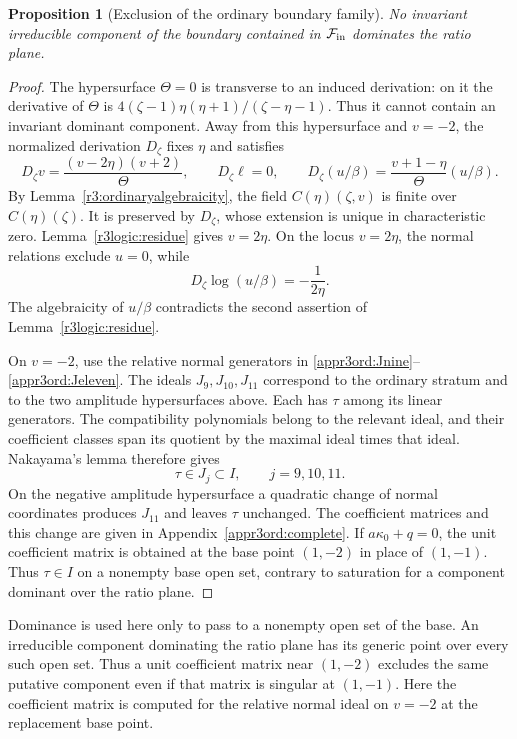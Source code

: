 \documentclass[11pt,a4paper]{article}
\numberwithin{equation}{section}
\theoremstyle{plain}
\newtheorem{proposition}[theorem]{Proposition}
\theoremstyle{definition}
\theoremstyle{remark}
\begin{document}
\begin{proposition}[Exclusion of the ordinary boundary family]
\label{r3:ordinaryexclusion}
No invariant irreducible component of the boundary contained
in $\mathcal F_{\rm in}$ dominates the ratio plane.
\end{proposition}
\begin{proof}
The hypersurface $\Theta=0$ is transverse to an induced derivation:
on it the derivative of $\Theta$ is
$4(\zeta-1)\eta(\eta+1)/(\zeta-\eta-1)$.
Thus it cannot contain an invariant dominant component.
Away from this hypersurface and $v=-2$, the normalized derivation
$D_\zeta$ fixes $\eta$ and satisfies
\begin{equation}\label{r3:ordinary-boundary-equations}
 D_\zeta v=\frac{(v-2\eta)(v+2)}{\Theta},\qquad
 D_\zeta\ell=0,\qquad
 D_\zeta(u/\beta)=\frac{v+1-\eta}{\Theta}(u/\beta).
\end{equation}
By Lemma~\ref{r3:ordinaryalgebraicity}, the field
$C(\eta)(\zeta,v)$ is finite over $C(\eta)(\zeta)$.
It is preserved by $D_\zeta$, whose extension is unique in
characteristic zero. Lemma~\ref{r3logic:residue} gives $v=2\eta$.
On the locus $v=2\eta$, the normal relations exclude $u=0$, while
\begin{equation}\label{r3:logarithmic-obstruction}
 D_\zeta\log(u/\beta)=-\frac1{2\eta}.
\end{equation}
The algebraicity of $u/\beta$ contradicts the second assertion of
Lemma~\ref{r3logic:residue}.

On $v=-2$, use the relative normal generators in
\eqref{appr3ord:Jnine}--\eqref{appr3ord:Jeleven}. The ideals
$J_9,J_{10},J_{11}$ correspond to the ordinary stratum and to the
two amplitude hypersurfaces above. Each has $\tau$ among its linear
generators. The compatibility polynomials belong to the relevant
ideal, and their coefficient classes span its quotient by the
maximal ideal times that ideal. Nakayama's lemma therefore gives
\[
 \tau\in J_j\subset I,\qquad j=9,10,11.
\]
On the negative amplitude hypersurface a quadratic change of normal
coordinates produces $J_{11}$ and leaves $\tau$ unchanged. The
coefficient matrices and this change are given in
Appendix~\ref{appr3ord:complete}. If $a\kappa_0+q=0$, the unit
coefficient matrix is obtained at the base point $(1,-2)$ in place
of $(1,-1)$. Thus $\tau\in I$ on a nonempty base open set, contrary
to saturation for a component dominant over the ratio plane.
\end{proof}

Dominance is used here only to pass to a nonempty open set of
the base. An irreducible component dominating the ratio plane
has its generic point over every such open set. Thus a unit
coefficient matrix near $(1,-2)$ excludes the same putative
component even if that matrix is singular at $(1,-1)$.
Here the coefficient matrix is computed for the relative normal
ideal on $v=-2$ at the replacement base point.
\end{document}
